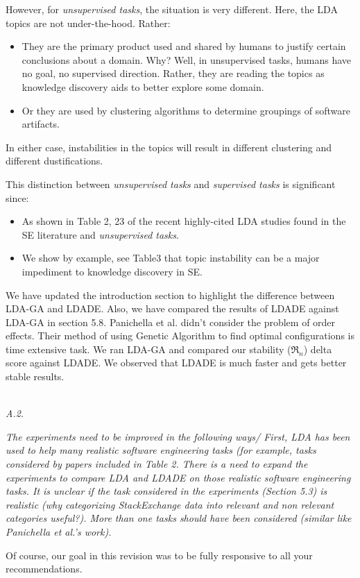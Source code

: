 \documentclass[conference]{IEEEtran}
\newcommand{\bi}{\begin{itemize}}
\newcommand{\ei}{\end{itemize}}
\begin{document}
However, for {\em unsupervised tasks}, the situation is very different. Here, the LDA topics are not under-the-hood. Rather:
\bi
\item
They are the primary product used and shared by humans to justify certain conclusions about a domain.
Why? Well, in unsupervised tasks, humans have no goal, no supervised direction. Rather, they are reading the topics as knowledge discovery aids to better explore some domain. 
\item Or they are used by clustering algorithms to determine groupings of software artifacts.
\ei
In either case, instabilities in the topics will result in different clustering and different dustifications.


This distinction between  {\em unsupervised tasks} and  {\em supervised tasks} is significant since:
\bi
\item
As shown in Table 2, 23 of the recent highly-cited LDA  studies found in the SE literature and {\em unsupervised tasks}. \item
We show by example, see Table3 that topic instability can be a major impediment to knowledge discovery in SE. 
\ei


We have updated the introduction section to highlight the difference between LDA-GA and LDADE. Also,
we have compared the results of LDADE against LDA-GA in section 5.8.
Panichella et al. didn't consider the problem of order effects. Their method of using Genetic Algorithm to find optimal configurations is time extensive task. We ran LDA-GA and compared our stability ($\Re_n$) delta score against LDADE. We observed that LDADE is much faster and gets better stable results. 


\noindent
\textit{\\A.2.} 

\textit{The experiments need to be improved in the following ways/ First, LDA has been used to help many realistic software engineering tasks (for example, tasks considered by papers included in Table 2. There is a need to expand the experiments to compare LDA and LDADE on those realistic software engineering tasks. It is unclear if the task considered in the experiments (Section 5.3) is realistic (why categorizing StackExchange data into relevant and non relevant categories useful?). More than one tasks should have been considered (similar like Panichella et al.'s work).\\}

Of course, our goal in this revision was to be fully responsive to all your   recommendations. 
\end{document}
